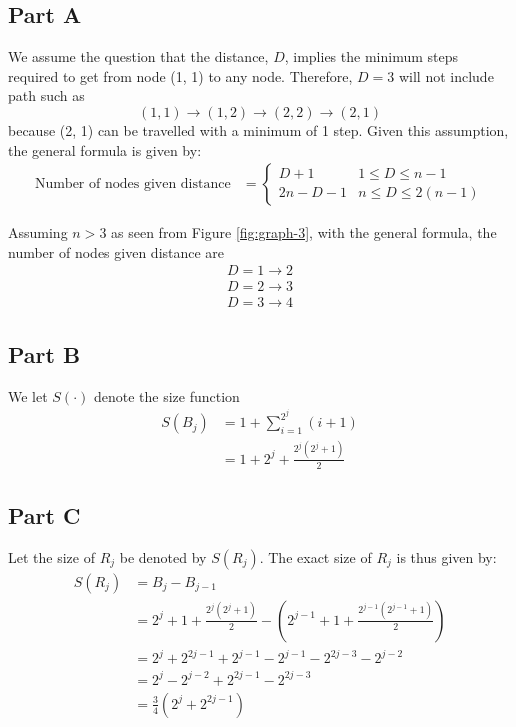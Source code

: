 \documentclass[]{article}
\newcommand{\e}{&=}
\begin{document}
\subsection*{Part A}

We assume the question that the distance, $D$, implies the minimum steps required to get from node (1, 1) to any node. Therefore, $D=3$ will not include path such as
\[
(1, 1) \rightarrow (1, 2) \rightarrow (2, 2) \rightarrow (2, 1)
\]
because (2, 1) can be travelled with a minimum of 1 step. Given this assumption, the general formula is given by:
\begin{align*}
\text{Number of nodes given distance} \e 
\begin{cases}
	D + 1 		& 1 \leq D \leq n - 1\\
	2n - D - 1	& n \leq D \leq 2(n - 1)
\end{cases}
\end{align*}

Assuming $n > 3$ as seen from Figure \ref{fig:graph-3}, with the general formula, the number of nodes given distance are
\begin{align*}
D = 1  \rightarrow 2 \\ 
D = 2  \rightarrow 3 \\
D = 3  \rightarrow 4
\end{align*}

\subsection*{Part B}

We let $S(\cdot)$ denote the size function
\begin{align*}
S(B_j) \e 1 + \sum_{i = 1}^{2^j} (i + 1) \\
	\e 1 + 2^j + \frac{ 2^j (2^j + 1)}{2} 
\end{align*}

\subsection*{Part C}

Let the size of $R_j$ be denoted by $S(R_j)$. The exact size of $R_j$ is thus given by:
\begin{align*}
S(R_j) \e B_j - B_{j-1} \\
	\e 	2^j + 1 + \frac{2^j(2^j + 1)}{2} 
		- \left( 2^{j-1} + 1 + \frac{2^{j - 1}(2^{j - 1} + 1)}{2} \right) \\
	\e 2^j + 2^{2j - 1} + 2^{j - 1} - 2^{j - 1} - 2^{2j - 3} - 2^{j - 2} \\
	\e 2^j - 2^{j - 2} + 2^{2j - 1} - 2^{2j - 3} \\
	\e \frac{3}{4} \left( 2^j + 2^{2j - 1} \right) 
\end{align*}
\end{document}
